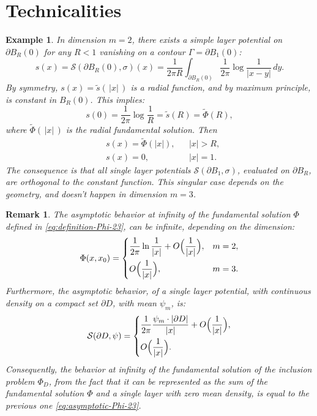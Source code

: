 \documentclass[10pt, a4paper, twoside, openright]{book}
\theoremstyle{definition}
\theoremstyle{plain}
\theoremstyle{plain}
\theoremstyle{plain}
\theoremstyle{plain}
\newtheorem{remark}[subsection]{Remark}
\theoremstyle{plain}
\theoremstyle{plain}
\newtheorem{example}[subsection]{Example}
\theoremstyle{plain}
\theoremstyle{plain}
\begin{document}
\section{Technicalities}
\begin{example}
 \label{example:van-s-lay}
 In dimension $m=2$, there exists a simple layer potential on $\partial B_R(0)$ for any $R<1$ vanishing on a contour $\Gamma = \partial B_1(0)$:
 \begin{equation}
 s(x) = \mathcal{S}(\partial B_R(0), \sigma)(x) = \frac{1}{2\pi R}\int_{\partial B_R(0)}\frac{1}{2\pi}\log\frac{1}{|x-y|}\,dy.
 \end{equation}
 By symmetry, $s(x)=\tilde{s}(\,|x|\,)$ is a radial function, and by maximum principle, is constant in $B_R(0)$. This implies:
 \begin{equation}
  s(0) = \frac{1}{2\pi}\log\frac{1}{R}=\tilde{s}(R)=\tilde{\Phi}(R),
 \end{equation}
 where $\tilde{\Phi}(\,|x|\,)$ is the radial fundamental solution. Then
 \begin{align}
 & s(x) = \tilde{\Phi}(|x|), && |x| > R, \\
 & s(x) = 0,         && |x| = 1.
 \end{align}
 The consequence is that all single layer potentials $\mathcal{S}(\partial B_1, \sigma)$, evaluated on $\partial B_R$, are orthogonal to the constant function. This singular case depends on the geometry, and doesn't happen in dimension $m=3$.
\end{example}
\begin{remark}
 The asymptotic behavior at infinity of the fundamental solution $\Phi$ defined in \eqref{eq:definition-Phi-23}, can be infinite, depending on the dimension:
 \begin{equation}
 \label{eq:asymptotic-Phi-23}
  \Phi(x,x_0)=
  \left\{
  \begin{aligned}
   &\dfrac{1}{2\pi}\ln\dfrac{1}{|x|} + O\Bigl(\dfrac{1}{|x|}\Bigr), && m=2, \\
   &O\Bigl(\dfrac{1}{|x|}\Bigr), && m=3.
  \end{aligned}
  \right.
\end{equation}
 Furthermore, the asymptotic behavior, of a single layer potential, with continuous density on a compact set $\partial D$, with mean $\psi_m$, is:
  \begin{equation}
 \label{eq:asymptotic-single}
  \mathcal{S}(\partial D,\psi)=
  \left\{
  \begin{aligned}
   &\dfrac{1}{2\pi}\dfrac{\psi_m\cdot|\partial D|}{|x|} + O\Bigl(\dfrac{1}{|x|}\Bigr), \\%
   &O\Bigl(\dfrac{1}{|x|}\Bigr). %
  \end{aligned}
  \right.
\end{equation}
Consequently, the behavior at infinity of the fundamental solution of the inclusion problem $\Phi_D$, 
from the fact that it can be represented as the sum of the fundamental solution $\Phi$ and a single layer with zero mean density, is equal to the previous one \eqref{eq:asymptotic-Phi-23}. 
\end{remark}
\end{document}
